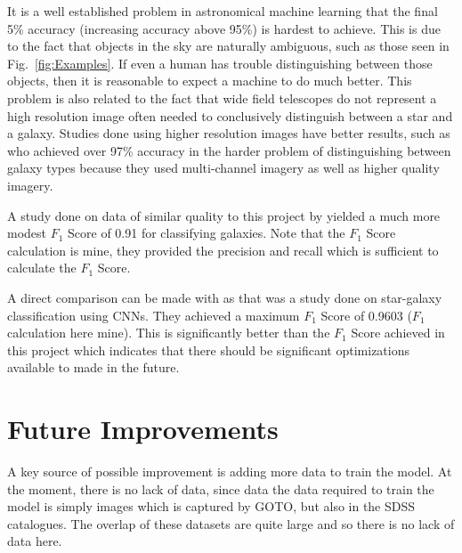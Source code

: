 \documentclass[a4paper,fleqn,usenatbib]{mnras}
\begin{document}
It is a well established problem in astronomical machine learning that the final 5\% accuracy (increasing accuracy above 95\%) is hardest to achieve. This is due to the fact that objects in the sky are naturally ambiguous, such as those seen in Fig.~\ref{fig:Examples}. If even a human has trouble distinguishing between those objects, then it is reasonable to expect a machine to do much better. This problem is also related to the fact that wide field telescopes do not represent a high resolution image often needed to conclusively distinguish between a star and a galaxy. Studies done using higher resolution images have better results, such as \citet{Khalifa2017} who achieved over 97\% accuracy in the harder problem of distinguishing between galaxy types because they used multi-channel imagery as well as higher quality imagery. 

A study done on data of similar quality to this project by \citet{Aniyan2017} yielded a much more modest $F_1$ Score of 0.91 for classifying galaxies. Note that the $F_1$ Score calculation is mine, they provided the precision and recall which is sufficient to calculate the $F_1$ Score. 

A direct comparison can be made with \citet{Kim2016} as that was a study done on star-galaxy classification using CNNs. They achieved a maximum $F_1$ Score of 0.9603 ($F_1$ calculation here mine). This is significantly better than the $F_1$ Score achieved in this project which indicates that there should be significant optimizations available to made in the future.

\section{Future Improvements}
A key source of possible improvement is adding more data to train the model. At the moment, there is no lack of data, since data the data required to train the model is simply images which is captured by GOTO, but also in the SDSS catalogues. The overlap of these datasets are quite large and so there is no lack of data here. 
\end{document}
